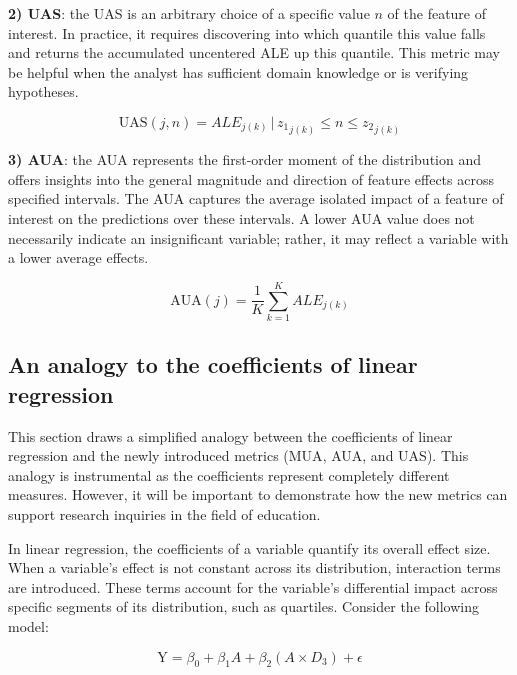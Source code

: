 \textbf{2) \gls{UAS}}:
the \gls{UAS} is an arbitrary choice of a specific value \(n\) of the feature of interest. In practice, it requires discovering into which quantile this value falls and returns the accumulated uncentered ALE up this quantile. This metric may be helpful when the analyst has sufficient domain knowledge or is verifying hypotheses.

\begin{equation}
\label{eq:UAS}
\text{UAS}(j, n) = ALE_{j(k)} \, | \, {z_1}_{j(k)} \leq n \leq {z_2}_{j(k)}
\end{equation}

\textbf{3) \gls{AUA}}: the \gls{AUA} represents the first-order moment of the distribution and offers insights into the general magnitude and direction of feature effects across specified intervals. The \gls{AUA} captures the average isolated impact of a feature of interest on the predictions over these intervals. A lower \gls{AUA} value does not necessarily indicate an insignificant variable; rather, it may reflect a variable with a lower average effects. 

\begin{equation}
\label{eq:AUA}
\text{AUA}(j) = \frac{1}{K} \sum_{k=1}^{K} ALE_{j(k)}
\end{equation}


\subsection{An analogy to the coefficients of linear regression}

This section draws a simplified analogy between the coefficients of linear regression and the newly introduced metrics (\gls{MUA}, \gls{AUA}, and \gls{UAS}). This analogy is instrumental as the coefficients represent completely different measures. However, it will be important to demonstrate how the new metrics can support research inquiries in the field of education.

In linear regression, the coefficients of a variable quantify its overall effect size. When a variable's effect is not constant across its distribution, interaction terms are introduced. These terms account for the variable's differential impact across specific segments of its distribution, such as quartiles. Consider the following model:

\begin{equation}
\label{eq:lm+inter+analogy}
\text{Y} = \beta_0 + \beta_1 A + \beta_2 (A \times D_3) + \epsilon
\end{equation}

